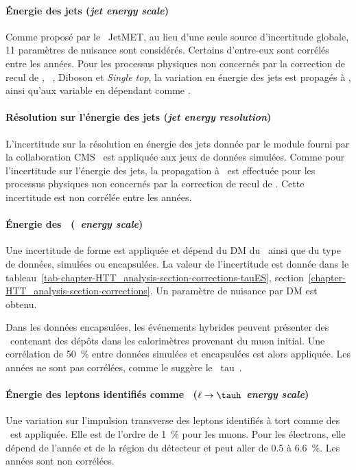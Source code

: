 \paragraph{Énergie des jets (\emph{jet energy scale})}
Comme proposé par le \POG\ JetMET, au lieu d'une seule source d'incertitude globale, 11 paramètres de nuisance sont considérés.
Certains d'entre-eux sont corrélés entre les années.
Pour les processus physiques non concernés par la correction de recul de \MET, \ie\ \ttbar, Diboson et \emph{Single top}, la variation en énergie des jets est propagés à \MET, ainsi qu'aux variable en dépendant comme \mTtot.
\paragraph{Résolution sur l'énergie des jets (\emph{jet energy resolution})}
L'incertitude sur la résolution en énergie des jets donnée par le module fourni par la collaboration CMS~\cite{JetResolution} est appliquée aux jeux de données simulées.
Comme pour l'incertitude sur l'énergie des jets, la propagation à \MET\ est effectuée pour les processus physiques non concernés par la correction de recul de \MET.
Cette incertitude est non corrélée entre les années.
\paragraph{Énergie des \tauh\ (\emph{\tauh\ energy scale})}
Une incertitude de forme est appliquée et dépend du DM du \tauh\ ainsi que du type de données, simulées ou encapsulées.
La valeur de l'incertitude est donnée dans le tableau~\ref{tab-chapter-HTT_analysis-section-corrections-tauES}, section~\ref{chapter-HTT_analysis-section-corrections}.
Un paramètre de nuisance par DM est obtenu.
\par
Dans les données encapsulées, les événements hybrides peuvent présenter des \tauh\ contenant des dépôts dans les calorimètres provenant du muon initial.
Une corrélation de \SI{50}{\%} entre données simulées et encapsulées est alors appliquée.
Les années ne sont pas corrélées, comme le suggère le \POG\ tau~\cite{TauPOG}.
\paragraph{Énergie des leptons identifiés comme \tauh\ (\emph{$\ell\to\tauh$ energy scale})}
Une variation sur l'impulsion transverse des leptons identifiés à tort comme des \tauh\ est appliquée.
Elle est de l'ordre de \SI{1}{\%} pour les muons.
Pour les électrons, elle dépend de l'année et de la région du détecteur et peut aller de \num{0.5} à \SI{6.6}{\%}.
Les années sont non corrélées.
